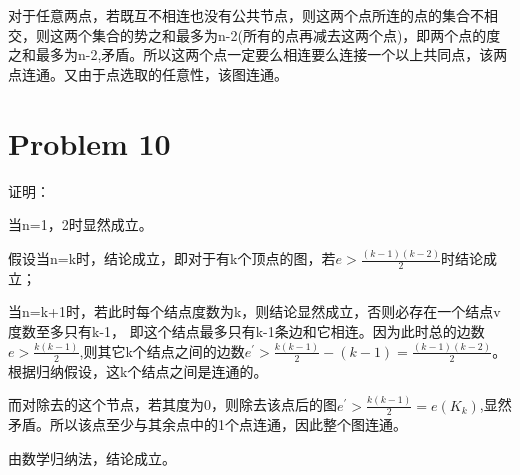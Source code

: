 \documentclass{article}
\begin{document}
对于任意两点，若既互不相连也没有公共节点，则这两个点所连的点的集合不相交，则这两个集合的势之和最多为n-2(所有的点再减去这两个点)，即两个点的度之和最多为n-2,矛盾。所以这两个点一定要么相连要么连接一个以上共同点，该两点连通。又由于点选取的任意性，该图连通。

\section*{Problem 10}
证明：

当n=1，2时显然成立。

假设当n=k时，结论成立，即对于有k个顶点的图，若$e>\frac{(k-1)(k-2)}{2}$时结论成立；

当n=k+1时，若此时每个结点度数为k，则结论显然成立，否则必存在一个结点v度数至多只有k-1，
即这个结点最多只有k-1条边和它相连。因为此时总的边数$e>\frac{k(k-1)}{2}$,则其它k个结点之间的边数$e^{'}>  \frac{k(k-1)}{2}-(k-1)=\frac{(k-1)(k-2)}{2}$。
根据归纳假设，这k个结点之间是连通的。

而对除去的这个节点，若其度为0，则除去该点后的图$e^{'}>\frac{k(k-1)}{2}=e(K_{k})$,显然矛盾。所以该点至少与其余点中的1个点连通，因此整个图连通。

由数学归纳法，结论成立。
\end{document}
